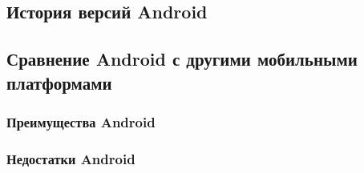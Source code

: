 \subsection{История версий Android}
\label{sub:android_platform:history}

\subsection{Сравнение Android с другими мобильными платформами}
\label{sub:android_platform:comparison}

\subsubsection{Преимущества Android}
\label{subsub:android_platform:comparison:pros}

\subsubsection{Недостатки Android}
\label{suubsub:android_platform:comparison:cons}
